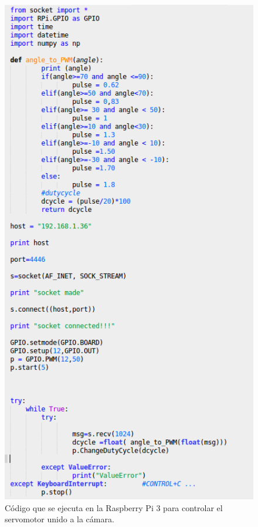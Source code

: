\documentclass[twoside, 11pt]{epstfg}
\begin{document}
\begin{figure}[H]
	\centerline{
		\mbox{\includegraphics[width=.70\textwidth]{images/codigosocketClient.png}}
	}
	\caption{Código que se ejecuta en la Raspberry Pi 3 para controlar el servomotor unido a la cámara.}
	\label{CodSC}
\end{figure}
\cleardoublepage
\printindex
\end{document}
